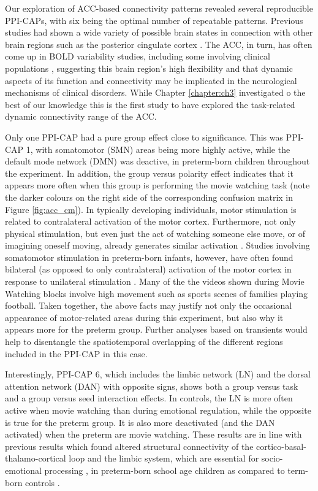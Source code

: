 Our exploration of ACC-based connectivity patterns revealed several reproducible PPI-CAPs, with six being the optimal number of repeatable patterns. Previous studies had shown a wide variety of possible brain states in connection with other brain regions such as the posterior cingulate cortex \citep{Liu2013a,Lin2017,Freitas2020}. The ACC, in turn, has often come up in BOLD variability studies, including some involving clinical populations \citep{Zoller2017,Zhang2020}, suggesting this brain region's high flexibility and that dynamic aspects of its function and connectivity may be implicated in the neurological mechanisms of clinical disorders. While Chapter \ref{chapter:ch3} investigated o the best of our knowledge this is the first study to  have explored the task-related dynamic connectivity range of the ACC.


Only one PPI-CAP had a pure group effect close to significance. This was PPI-CAP 1, with somatomotor (SMN) areas being more highly active, while the default mode network (DMN) was deactive, in preterm-born children throughout the experiment. In addition, the group versus polarity effect indicates that it appears more often when this group is performing the movie watching task (note the darker colours on the right side of the corresponding confusion matrix in Figure \ref{fig:acc_cm}). In typically developing individuals, motor stimulation is related to contralateral activation of the motor cortex. Furthermore, not only physical stimulation, but even just the act of watching someone else move, or of imagining oneself moving, already generates similar activation \citep{Butler2006}. Studies involving somatomotor stimulation in preterm-born infants, however, have often found bilateral (as opposed to only contralateral) activation of the motor cortex in response to unilateral stimulation \citep{Heep2009a,Arichi2010,Allievi2016}. Many of the the videos shown during Movie Watching blocks involve high movement such as sports scenes of families playing football. Taken together, the above facts may justify not only the occasional appearance of motor-related areas during this experiment, but also why it appears more for the preterm group. Further analyses based on transients \citep{Karahanoglu2015a,Freitas2020} would help to disentangle the spatiotemporal overlapping of the different regions included in the PPI-CAP in this case.

Interestingly, PPI-CAP 6, which includes the limbic network (LN) and the dorsal attention network (DAN) with opposite signs, shows both a group versus task and a group versus seed interaction effects. In controls, the LN is more often active when movie watching than during emotional regulation, while the opposite is true for the preterm group. It is also more deactivated (and the DAN activated) when the preterm are movie watching. These results are in line with previous results which found altered structural connectivity of the cortico-basal-thalamo-cortical loop and the limbic system, which are essential for socio-emotional processing \citep{Olson2007,Braun2011}, in preterm-born school age children as compared to term-born controls \citep{Fischi-Gomez2015,Fischi-Gomez2016a}.

